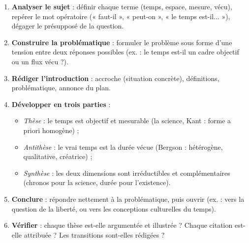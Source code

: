 \documentclass[11pt]{article}
\begin{document}
\begin{methode}
\begin{enumerate}
\item \textbf{Analyser le sujet} : définir chaque terme (temps, espace, mesure, vécu), repérer le mot opératoire (« faut-il », « peut-on », « le temps est-il... »), dégager le présupposé de la question.
\item \textbf{Construire la problématique} : formuler le problème sous forme d'une tension entre deux réponses possibles (ex. : le temps est-il un cadre objectif ou un flux vécu ?).
\item \textbf{Rédiger l'introduction} : accroche (situation concrète), définitions, problématique, annonce du plan.
\item \textbf{Développer en trois parties} :
   \begin{itemize}
   \item \emph{Thèse} : le temps est objectif et mesurable (la science, Kant : forme a priori homogène) ;
   \item \emph{Antithèse} : le vrai temps est la durée vécue (Bergson : hétérogène, qualitative, créatrice) ;
   \item \emph{Synthèse} : les deux dimensions sont irréductibles et complémentaires (chronos pour la science, durée pour l'existence).
   \end{itemize}
\item \textbf{Conclure} : répondre nettement à la problématique, puis ouvrir (ex. : vers la question de la liberté, ou vers les conceptions culturelles du temps).
\item \textbf{Vérifier} : chaque thèse est-elle argumentée et illustrée ? Chaque citation est-elle attribuée ? Les transitions sont-elles rédigées ?
\end{enumerate}
\end{methode}
\end{document}
